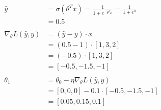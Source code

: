 \documentclass[a4paper]{article}
\theoremstyle{definition}
\newenvironment{soln}{
    \leavevmode\color{blue}\ignorespaces
}{}
\begin{document}
\begin{enumerate}
\begin{enumerate}
		            \begin{soln}
			            \begin{align*}
				            \hat{y}                       & = \sigma(\theta^Tx) = \frac{1}{1 + e^{-\theta^Tx}} = \frac{1}{1 + e^{0}} \\
				                                          & = 0.5                                                                    \\\\
				            \nabla_{\theta} L(\hat{y}, y) & = (\hat{y} - y) \cdot x                                                  \\
				                                          & = (0.5 - 1) \cdot [1, 3, 2]                                              \\
				                                          & = (-0.5) \cdot [1, 3, 2]                                                 \\
				                                          & = [-0.5, -1.5, -1]                                                       \\\\
				            \theta_1                      & = \theta_0 - \eta \nabla_{\theta} L(\hat{y}, y)                          \\
				                                          & = [0, 0, 0] - 0.1 \cdot [-0.5, -1.5, -1]                                 \\
				                                          & = [0.05, 0.15, 0.1]                                                      \\
			            \end{align*}

		            \end{soln}

	      \end{enumerate}
\end{enumerate}
\end{document}

